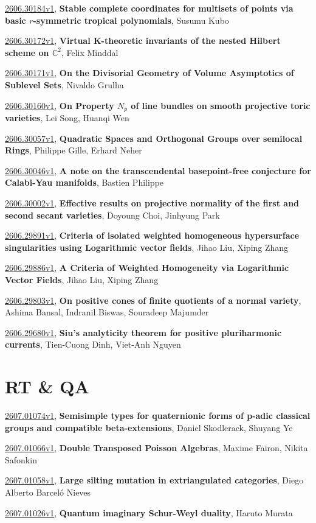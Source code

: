 \documentclass[9pt, a4paper]{article}
\theoremstyle{plain}
\theoremstyle{definition}
\theoremstyle{remark}
\newcommand{\arxiv}[3]{\href{https://arxiv.org/abs/#1}{#1}, \textbf{\textcolor{arxivblue}{#2}}, #3}
\begin{document}
\arxiv{2606.30184v1}{Stable complete coordinates for multisets of points via basic $r$-symmetric tropical polynomials}{Susumu Kubo}

\arxiv{2606.30172v1}{Virtual K-theoretic invariants of the nested Hilbert scheme on $\mathbb{C}^2$}{Felix Minddal}

\arxiv{2606.30171v1}{On the Divisorial Geometry of Volume Asymptotics of Sublevel Sets}{Nivaldo Grulha}

\arxiv{2606.30160v1}{On Property $N_p$ of line bundles on smooth projective toric varieties}{Lei Song, Huanqi Wen}

\arxiv{2606.30057v1}{Quadratic Spaces and Orthogonal Groups over semilocal Rings}{Philippe Gille, Erhard Neher}

\arxiv{2606.30046v1}{A note on the transcendental basepoint-free conjecture for Calabi-Yau manifolds}{Bastien Philippe}

\arxiv{2606.30002v1}{Effective results on projective normality of the first and second secant varieties}{Doyoung Choi, Jinhyung Park}

\arxiv{2606.29891v1}{Criteria of isolated weighted homogeneous hypersurface singularities using Logarithmic vector fields}{Jihao Liu, Xiping Zhang}

\arxiv{2606.29886v1}{A Criteria of Weighted Homogeneity via Logarithmic Vector Fields}{Jihao Liu, Xiping Zhang}

\arxiv{2606.29803v1}{On positive cones of finite quotients of a normal variety}{Ashima Bansal, Indranil Biswas, Souradeep Majumder}

\arxiv{2606.29680v1}{Siu's analyticity theorem for positive pluriharmonic currents}{Tien-Cuong Dinh, Viet-Anh Nguyen}


\section{RT \& QA}
\arxiv{2607.01074v1}{Semisimple types for quaternionic forms of p-adic classical groups and compatible beta-extensions}{Daniel Skodlerack, Shuyang Ye}

\arxiv{2607.01066v1}{Double Transposed Poisson Algebras}{Maxime Fairon, Nikita Safonkin}

\arxiv{2607.01058v1}{Large silting mutation in extriangulated categories}{Diego Alberto Barceló Nieves}

\arxiv{2607.01026v1}{Quantum imaginary Schur-Weyl duality}{Haruto Murata}
\end{document}
